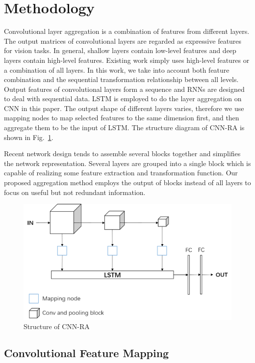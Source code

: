 \documentclass[runningheads]{llncs}
\begin{document}
\section{Methodology}
Convolutional layer aggregation is a combination of features from different layers. The output matrices of convolutional layers are regarded as expressive features for vision tasks. In general, shallow layers contain low-level features and deep layers contain high-level features. Existing work simply uses high-level features or a combination of all layers. In this work, we take into account both feature combination and the sequential transformation relationship between all levels. Output features of convolutional layers form a sequence and RNNs are designed to deal with sequential data. LSTM is employed to do the layer aggregation on CNN in this paper. The output shape of different layers varies, therefore we use mapping nodes to map selected features to the same dimension first, and then aggregate them to be the input of LSTM. The structure diagram of CNN-RA is shown in Fig.~\ref{fig:CNN-RA}.

Recent network design tends to assemble several blocks together and simplifies the network representation. Several layers are grouped into a single block which is capable of realizing some feature extraction and transformation function. Our proposed aggregation method employs the output of blocks instead of all layers to focus on useful but not redundant information. 

\begin{figure}  
	\centering
	\includegraphics[width=12cm]{Figures/CNN-RA.png}
	\caption{Structure of CNN-RA}
	\label{fig:CNN-RA}
\end{figure}

\subsection{Convolutional Feature Mapping}
\end{document}
